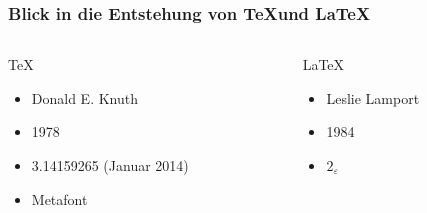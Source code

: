\begin{frame}
    \frametitle{Blick in die Entstehung von \TeX und \LaTeX}
    \begin{columns}
        \begin{column}{0.50\textwidth}
            \begin{block}{\TeX}
                \begin{itemize}
                    \item Donald E. Knuth
                    \item 1978
                    \item 3.14159265 (Januar 2014)
                    \item Metafont
                \end{itemize}
            \end{block}
        \end{column}
        \pause
        \begin{column}{0.50\textwidth}
            \begin{block}{\LaTeX}
                \begin{itemize}
                    \item Leslie Lamport
                    \item 1984
                    \item $2_\varepsilon$
                \end{itemize}
            \end{block}
        \end{column}
    \end{columns}
\end{frame}

